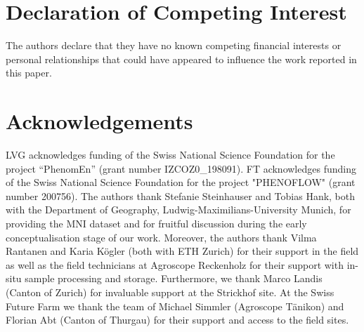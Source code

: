 \section*{Declaration of Competing Interest}

The authors declare that they have no known competing financial interests or personal relationships that could have appeared to influence the work reported in this paper.

\section*{Acknowledgements}
LVG acknowledges funding of the Swiss National Science Foundation for the project “PhenomEn” (grant number IZCOZ0\_198091). FT acknowledges funding of the Swiss National Science Foundation for the project "PHENOFLOW" (grant number 200756).
The authors thank Stefanie Steinhauser and Tobias Hank, both with the Department of Geography, Ludwig-Maximilians-University Munich, for providing the MNI dataset and for fruitful discussion during the early conceptualisation stage of our work. Moreover, the authors thank Vilma Rantanen and Karia Kögler (both with ETH Zurich) for their support in the field as well as the field technicians at Agroscope Reckenholz for their support with in-situ sample processing and storage. Furthermore, we thank Marco Landis (Canton of Zurich) for invaluable support at the Strickhof site. At the Swiss Future Farm we thank the team of Michael Simmler (Agroscope Tänikon) and Florian Abt (Canton of Thurgau) for their support and access to the field sites.
